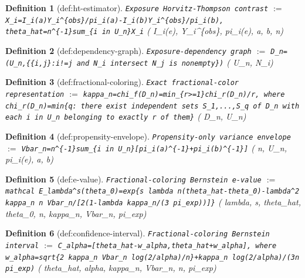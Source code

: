 \documentclass{article}
\newtheorem{definition}{Definition}
\begin{document}
\begin{definition}[def:ht-estimator]\label{def:ht-estimator}
\texttt{Exposure Horvitz-Thompson contrast} $:=$ \texttt{X\_i=I\_i(a)Y\_i\textasciicircum{}\{obs\}/pi\_i(a)-I\_i(b)Y\_i\textasciicircum{}\{obs\}/pi\_i(b), theta\_hat=n\textasciicircum{}\{-1\}sum\_\{i in U\_n\}X\_i} \quad ( I\_i(e), Y\_i\textasciicircum{}\{obs\}, pi\_i(e), a, b, n)
\end{definition}

\begin{definition}[def:dependency-graph]\label{def:dependency-graph}
\texttt{Exposure-dependency graph} $:=$ \texttt{D\_n=(U\_n,\{\{i,j\}:i!=j and N\_i intersect N\_j is nonempty\})} \quad ( U\_n, N\_i)
\end{definition}

\begin{definition}[def:fractional-coloring]\label{def:fractional-coloring}
\texttt{Exact fractional-color representation} $:=$ \texttt{kappa\_n=chi\_f(D\_n)=min\_\{r>=1\}chi\_r(D\_n)/r, where chi\_r(D\_n)=min\{q: there exist independent sets S\_1,...,S\_q of D\_n with each i in U\_n belonging to exactly r of them\}} \quad ( D\_n, U\_n)
\end{definition}

\begin{definition}[def:propensity-envelope]\label{def:propensity-envelope}
\texttt{Propensity-only variance envelope} $:=$ \texttt{Vbar\_n=n\textasciicircum{}\{-1\}sum\_\{i in U\_n\}[pi\_i(a)\textasciicircum{}\{-1\}+pi\_i(b)\textasciicircum{}\{-1\}]} \quad ( n, U\_n, pi\_i(e), a, b)
\end{definition}

\begin{definition}[def:e-value]\label{def:e-value}
\texttt{Fractional-coloring Bernstein e-value} $:=$ \texttt{mathcal E\_lambda\textasciicircum{}s(theta\_0)=exp\{s lambda n(theta\_hat-theta\_0)-lambda\textasciicircum{}2 kappa\_n n Vbar\_n/[2(1-lambda kappa\_n/(3 pi\_exp))]\}} \quad ( lambda, s, theta\_hat, theta\_0, n, kappa\_n, Vbar\_n, pi\_exp)
\end{definition}

\begin{definition}[def:confidence-interval]\label{def:confidence-interval}
\texttt{Fractional-coloring Bernstein interval} $:=$ \texttt{C\_alpha=[theta\_hat-w\_alpha,theta\_hat+w\_alpha], where w\_alpha=sqrt\{2 kappa\_n Vbar\_n log(2/alpha)/n\}+kappa\_n log(2/alpha)/(3n pi\_exp)} \quad ( theta\_hat, alpha, kappa\_n, Vbar\_n, n, pi\_exp)
\end{definition}
\end{document}
